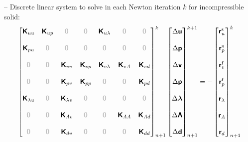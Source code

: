 \documentclass[a4paper,12pt]{report}
\newcommand{\bs}[1]{\boldsymbol{#1}}
\newcommand{\zerom}{\textcolor{lightgray}{\bs{\mathsf{0}}}}
\newcommand{\ROP}{\bs{\mathsf{r}}}
\newcommand{\LM}{\bs{\mathsf{\lambda}}}
\newcommand{\LMZ}{\bs{\mathsf{\Lambda}}}
\newcommand{\lmi}{\lambda} %
\newcommand{\lmzi}{\mathit{\Lambda}} %
\begin{document}
-- Discrete linear system to solve in each Newton iteration $k$ for incompressible solid:
\begin{equation}
\label{equation-lin-sys-fsi-0d-inc}
\begin{aligned}
\begin{bmatrix} \bs{\mathsf{K}}_{uu} & \bs{\mathsf{K}}_{up} & \zerom & \zerom & \bs{\mathsf{K}}_{u\lmi} & \zerom & \zerom \\ \\ \bs{\mathsf{K}}_{pu} & \zerom & \zerom & \zerom & \zerom & \zerom & \zerom \\ \\ \zerom & \zerom & \bs{\mathsf{K}}_{vv} & \bs{\mathsf{K}}_{vp} & \bs{\mathsf{K}}_{v\lmi} & \bs{\mathsf{K}}_{v\lmzi} & \bs{\mathsf{K}}_{vd} \\ \\ \zerom & \zerom & \bs{\mathsf{K}}_{pv} & \bs{\mathsf{K}}_{pp} & \zerom & \zerom & \bs{\mathsf{K}}_{pd} \\ \\ \bs{\mathsf{K}}_{\lmi u} & \zerom & \bs{\mathsf{K}}_{\lmi v} & \zerom & \zerom & \zerom & \zerom \\ \\ \zerom & \zerom & \bs{\mathsf{K}}_{\lmzi v} & \zerom & \zerom & \bs{\mathsf{K}}_{\lmzi \lmzi} & \bs{\mathsf{K}}_{\lmzi d} \\ \\ \zerom &  \zerom & \bs{\mathsf{K}}_{dv}  & \zerom & \zerom & \zerom & \bs{\mathsf{K}}_{dd} \end{bmatrix}_{n+1}^{k}\begin{bmatrix} \Delta\bs{\mathsf{u}} \\ \\ \Delta\bs{\mathsf{p}} \\ \\ \Delta\bs{\mathsf{v}} \\ \\ \Delta\bs{\mathsf{p}} \\ \\ \Delta\LM \\ \\ \Delta\LMZ \\ \\ \Delta\bs{\mathsf{d}} \end{bmatrix}_{n+1}^{k+1}=-\begin{bmatrix} \ROP_{u}^{\mathrm{s}} \\ \\ \ROP_{p}^{\mathrm{s}} \\ \\ \ROP_{v}^{\mathrm{f}} \\ \\ \ROP_{p}^{\mathrm{f}} \\ \\ \ROP_{\lmi} \\ \\ \ROP_{\lmzi} \\ \\ \ROP_{d}\end{bmatrix}_{n+1}^{k}
\end{aligned}
\end{equation}
\end{document}

